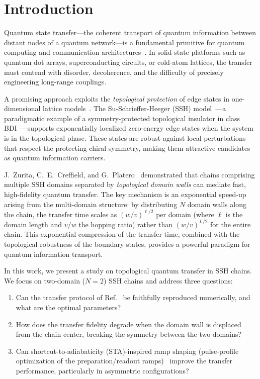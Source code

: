 \documentclass[
  reprint,
  amsmath,
  amssymb,
  aps,
  prb,
  floatfix,
  longbibliography,
]{revtex4-2}
\begin{document}
\maketitle

\section{Introduction}
\label{sec:intro}

Quantum state transfer---the coherent transport of quantum information between
distant nodes of a quantum network---is a fundamental primitive for quantum
computing and communication architectures~\cite{Bose2003, Christandl2004,
Nikolopoulos2014}. In solid-state platforms such as quantum dot arrays,
superconducting circuits, or cold-atom lattices, the transfer must contend with
disorder, decoherence, and the difficulty of precisely engineering long-range
couplings.

A promising approach exploits the \emph{topological protection} of edge states in
one-dimensional lattice models~\cite{Hasan2010, Asboth2016}. The
Su-Schrieffer-Heeger (SSH) model~\cite{SSH1979, SSH1980}---a paradigmatic
example of a symmetry-protected topological insulator in class BDI~\cite{Ryu2010}---supports
exponentially localized zero-energy edge states when the system is in the
topological phase. These states are robust against local perturbations that respect
the protecting chiral symmetry, making them attractive candidates as quantum
information carriers.

J.~Zurita, C.~E.~Creffield, and G.~Platero~\cite{Zurita2023} demonstrated that chains
comprising multiple SSH domains separated by \emph{topological domain walls}
can mediate fast, high-fidelity quantum transfer. The key mechanism is an
exponential speed-up arising from the multi-domain structure: by distributing
$N$ domain walls along the chain, the transfer time scales as
$(w/v)^{\ell/2}$ per domain (where $\ell$ is the domain length and $v/w$ the
hopping ratio) rather than $(w/v)^{L/2}$ for the entire chain. This exponential
compression of the transfer time, combined with the topological robustness of
the boundary states, provides a powerful paradigm for quantum information
transport.

In this work, we present a study on topological
quantum transfer in SSH chains. We focus on two-domain ($N = 2$) SSH chains and address three
questions:
\begin{enumerate}
  \item Can the transfer protocol of Ref.~\cite{Zurita2023} be faithfully
    reproduced numerically, and what are the optimal parameters?
  \item How does the transfer fidelity degrade when the domain wall is displaced
    from the chain center, breaking the symmetry between the two domains?
  \item Can shortcut-to-adiabaticity (STA)-inspired ramp shaping (pulse-profile
    optimization of the preparation/readout ramps)~\cite{Demirplak2003, Berry2009, GueryOdelin2019} improve the
    transfer performance, particularly in asymmetric configurations?
\end{enumerate}
\end{document}
